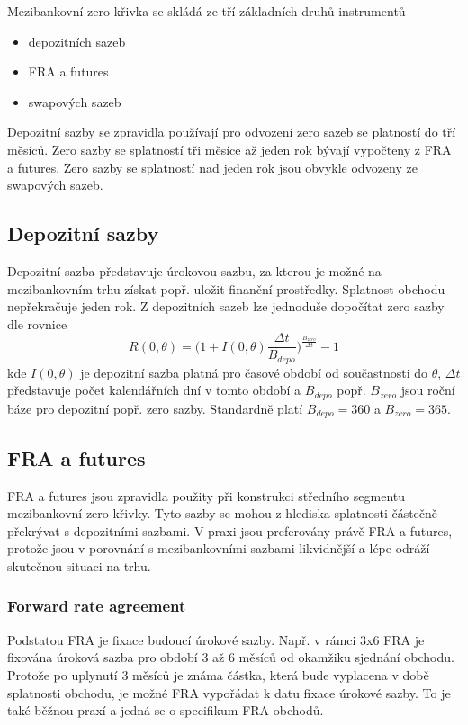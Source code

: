 \documentclass[a4paper]{book}
\begin{document}
Mezibankovní zero křivka se skládá ze tří základních druhů instrumentů
\begin{itemize}
\item depozitních sazeb
\item FRA a futures
\item swapových sazeb
\end{itemize}
Depozitní sazby se zpravidla používají pro odvození zero sazeb se platností do tří měsíců. Zero sazby se splatností tři měsíce až jeden rok bývají vypočteny z FRA a futures. Zero sazby se splatností nad jeden rok jsou obvykle odvozeny ze swapových sazeb.

\subsection{Depozitní sazby}

Depozitní sazba představuje úrokovou sazbu, za kterou je možné na mezibankovním trhu získat popř. uložit finanční prostředky. Splatnost obchodu nepřekračuje jeden rok. Z depozitních sazeb lze jednoduše dopočítat zero sazby dle rovnice
\begin{equation*}
R(0, \theta) = \Bigg(1 + I(0,\theta)\frac{\Delta t}{B_{depo}} \Bigg)^{\frac{B_{zero}}{\Delta t}} - 1
\end{equation*}
kde $I(0,\theta)$ je depozitní sazba platná pro časové období od součastnosti do $\theta$, $\Delta t$ představuje počet kalendářních dní v tomto období a $B_{depo}$ popř. $B_{zero}$ jsou roční báze pro depozitní popř. zero sazby. Standardně platí $B_{depo} = 360$ a $B_{zero} = 365$.

\subsection{FRA a futures}

FRA a futures jsou zpravidla použity při konstrukci středního segmentu mezibankovní zero křivky. Tyto sazby se mohou z hlediska splatnosti částečně překrývat s depozitními sazbami. V praxi jsou preferovány právě FRA a futures, protože jsou v porovnání s mezibankovními sazbami likvidnější a lépe odráží skutečnou situaci na trhu.

\subsubsection{Forward rate agreement}

Podstatou FRA je fixace budoucí úrokové sazby. Např. v rámci 3x6 FRA je fixována úroková sazba pro období 3 až 6 měsíců od okamžiku sjednání obchodu. Protože po uplynutí 3 měsíců je známa částka, která bude vyplacena v době splatnosti obchodu, je možné FRA vypořádat k datu fixace úrokové sazby. To je také běžnou praxí a jedná se o specifikum FRA obchodů.
\end{document}
